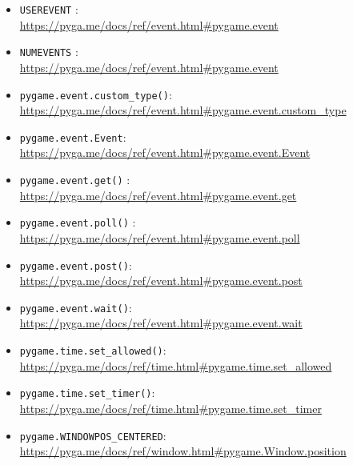 \begin{pygbox}
\begin{itemize}
	\item \texttt{USEREVENT}
    :\\
    \url{https://pyga.me/docs/ref/event.html#pygame.event}

    \item \texttt{NUMEVENTS}
    :\\
    \url{https://pyga.me/docs/ref/event.html#pygame.event}

	\item \texttt{pygame.event.custom\_type()}:
	\\
	\url{https://pyga.me/docs/ref/event.html#pygame.event.custom_type}
	
	\item \texttt{pygame.event.Event}:
	\\
	\url{https://pyga.me/docs/ref/event.html#pygame.event.Event}

	\item \texttt{pygame.event.get()}
    :\\
    \url{https://pyga.me/docs/ref/event.html#pygame.event.get}

	\item \texttt{pygame.event.poll()}
	:\\
	\url{https://pyga.me/docs/ref/event.html#pygame.event.poll}

	\item \texttt{pygame.event.post()}:
	\\
	\url{https://pyga.me/docs/ref/event.html#pygame.event.post}
	
	\item \texttt{pygame.event.wait()}:
	\\
	\url{https://pyga.me/docs/ref/event.html#pygame.event.wait}

	\item \texttt{pygame.time.set\_allowed()}:
	\\
	\url{https://pyga.me/docs/ref/time.html#pygame.time.set_allowed}

	\item \texttt{pygame.time.set\_timer()}:
	\\
	\url{https://pyga.me/docs/ref/time.html#pygame.time.set_timer}

	\item \texttt{pygame.WINDOWPOS\_CENTERED}:
	\\
	\url{https://pyga.me/docs/ref/window.html#pygame.Window.position}
\end{itemize}
\end{pygbox}



